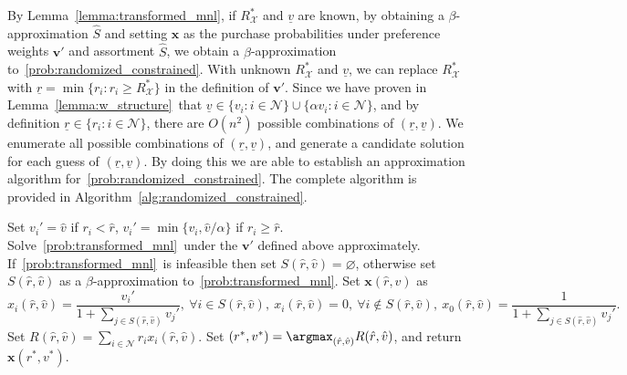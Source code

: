\documentclass[mnsc,non-blindrev]{informs3}
\theoremstyle{definition}
\begin{document}
By Lemma~\ref{lemma:transformed_mnl}, if $R^*_{\mathcal{X}}$ and $\underline{v}$ are known, by obtaining a $\beta$-approximation $\hat{S}$ and setting $\bm{x}$ as the purchase probabilities under preference weights $\bm{v}'$ and assortment $\hat{S}$, we obtain a $\beta$-approximation to~\ref{prob:randomized_constrained}. With unknown $R^*_{\mathcal{X}}$ and $\underline{v}$, we can replace $R^*_{\mathcal{X}}$ with \mbox{$\underline{r}=\min\{r_i:r_i\geq R^*_{\mathcal{X}}\}$} in the definition of $\bm{v}'$. Since we have proven in Lemma~\ref{lemma:w_structure}~that $\underline{v}\in\{v_i:i\in\mathcal{N}\}\cup\{\alpha v_i:i\in\mathcal{N}\}$, and by definition $\underline{r}\in\{r_i:i\in\mathcal{N}\}$, there are $O(n^2)$ possible combinations of $(\underline{r},\underline{v})$. We enumerate all possible combinations of $(\underline{r},\underline{v})$, and generate a candidate solution for each guess of $(\underline{r},\underline{v})$. By doing this we are able to establish an approximation algorithm for~\ref{prob:randomized_constrained}. The complete algorithm is provided in Algorithm~\ref{alg:randomized_constrained}.

\begin{algorithm}[t]
\SingleSpacedXI
\caption{Algorithm for~\ref{prob:randomized_constrained}}
\label{alg:randomized_constrained}
\begin{algorithmic}
\State Set $v_i'=\hat{v}$ if $r_i<\hat{r}$, $v_i'=\min\{v_i,\hat{v}/\alpha\}$ if $r_i\geq \hat{r}$. 
\State Solve~\ref{prob:transformed_mnl}~under the $\bm{v}'$ defined above approximately. If~\ref{prob:transformed_mnl}~is infeasible then set $S{(\hat{r},\hat{v})}=\varnothing$, otherwise set $S{(\hat{r},\hat{v})}$ as a $\beta$-approximation to~\ref{prob:transformed_mnl}.
\State Set $\bm{x}{(\hat{r},\hat{v})}$ as
\begin{equation*}
x_i{(\hat{r},\hat{v})}=\dfrac{v_i'}{1+\sum_{j\in S{(\hat{r},\hat{v})}}v_j'},\ \forall i\in S{(\hat{r},\hat{v})},\ x_i{(\hat{r},\hat{v})}=0,\ \forall i\notin  S{(\hat{r},\hat{v})},\ x_0(\hat{r},\hat{v})=\dfrac{1}{1+\sum_{j\in S(\hat{r},\hat{v})} v_j'}.
\end{equation*}
\State Set $R{(\hat{r},\hat{v})}=\sum_{i\in\mathcal{N}}r_ix_i{(\hat{r},\hat{v})}$.
\EndFor
\EndFor
\State Set $(r^*,v^*)=\argmax_{(\hat{r},\hat{v})}R{(\hat{r},\hat{v})}$, and return $\bm{x}{(r^*,v^*)}$.
\end{algorithmic}
\end{algorithm}
\end{document}
